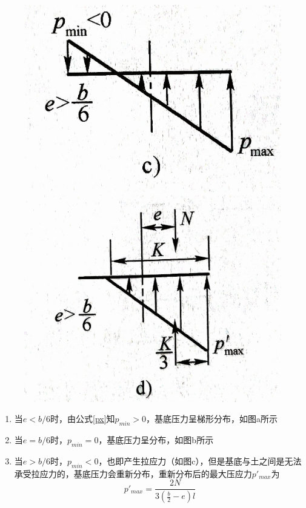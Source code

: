 \documentclass[12pt,a4paper]{ctexart}
\begin{document}
	\begin{figure}[H]
		\centering
		\begin{minipage}[c]{0.3\textwidth}
			\centering
			\includegraphics[width=1.1\textwidth]{c}
		\end{minipage}
		\begin{minipage}[c]{0.3\textwidth}
			\centering
			\includegraphics[width=1.1\textwidth]{d}
		\end{minipage}
	\end{figure}

	\begin{enumerate}
		\item 当$e<b/6$时，由公式\ref{px}知$p_{min}>0$，基底压力呈梯形分布，如图a所示
		\item 当$e=b/6$时，$p_{min}=0$，基底压力呈分布，如图b所示
		\item 当$e>b/6$时，$p_{min}<0$，也即产生拉应力（如图c），但是基底与土之间是无法承受拉应力的，基底压力会重新分布，重新分布后的最大压应力$p'_{max}$为
		\begin{equation}
			p'_{max}=\frac{2N}{3(\frac{b}{2}-e)l}
		\end{equation}
	\end{enumerate}
	  
\end{document}
